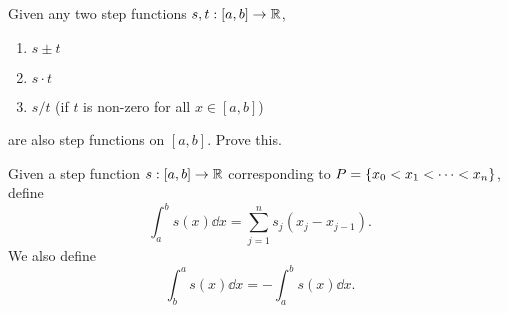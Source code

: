 \begin{rem}
    Given any two step functions $s, t : [a, b] \to \mathbb{R}$,
    \begin{enumerate}[label=(\alph*)]
        \item $s \pm t$
        \item $s \cdot t$
        \item $s / t$ (if $t$ is non-zero for all $x \in [a, b]$)
    \end{enumerate}
    are also step functions on $[a, b]$. \textcolor{red!70!black}{Prove this}.
\end{rem}

\begin{defn} \label{defn:step int}
    Given a step function $s : [a, b] \to \mathbb{R}$ corresponding to $P = \set{x_{0} < x_{1} < \dots < x_{n}}$, define \[
        \int_{a}^{b} s(x) \dd x = \sum_{j=1}^{n} s_{j} (x_{j} - x_{j-1}).
\] We also define \[
    \int_{b}^{a} s(x) \dd x = - \int_{a}^{b} s(x) \dd x.
\]
\end{defn}





